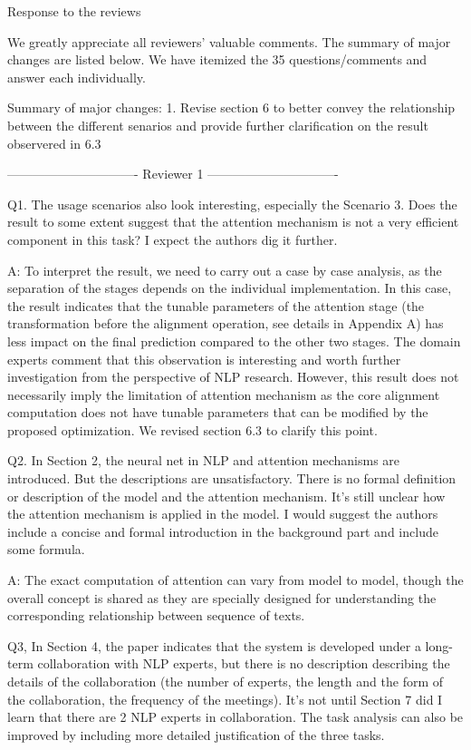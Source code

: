 Response to the reviews

We greatly appreciate all reviewers' valuable comments. The summary of major changes are listed below. We have itemized the 35 questions/comments and answer each individually.

Summary of major changes:
1. Revise section 6 to better convey the relationship between the different senarios and provide further clarification on the result observered in 6.3


------------------------------- Reviewer 1 -------------------------------


Q1. The usage scenarios also look interesting, especially the Scenario 3. Does the result to some extent suggest that the attention mechanism is not a very efficient component in this task? I expect the authors dig it further.

A: To interpret the result, we need to carry out a case by case analysis, as the separation of the stages depends on the individual implementation. In this case, the result indicates that the tunable parameters of the attention stage (the transformation before the alignment operation, see details in Appendix A) has less impact on the final prediction compared to the other two stages. The domain experts comment that this observation is interesting and worth further investigation from the perspective of NLP research. However, this result does not necessarily imply the limitation of attention mechanism as the core alignment computation does not have tunable parameters that can be modified by the proposed optimization. We revised section 6.3 to clarify this point.


Q2. In Section 2, the neural net in NLP and attention mechanisms are introduced. But the descriptions are unsatisfactory. There is no formal definition or description of the model and the attention mechanism. It's still unclear how the attention mechanism is applied in the model. I would suggest the authors include a concise and formal introduction in the background part and include some formula.

A: The exact computation of attention can vary from model to model, though the overall concept is shared as they are specially designed for understanding the corresponding relationship between sequence of texts.

Q3, In Section 4, the paper indicates that the system is developed under a long-term collaboration with NLP experts, but there is no description describing the details of the collaboration (the number of experts, the length and the form of the collaboration, the frequency of the meetings). It's not until Section 7 did I learn that there are 2 NLP experts in collaboration. The task analysis can also be improved by including more detailed justification of the three tasks.

